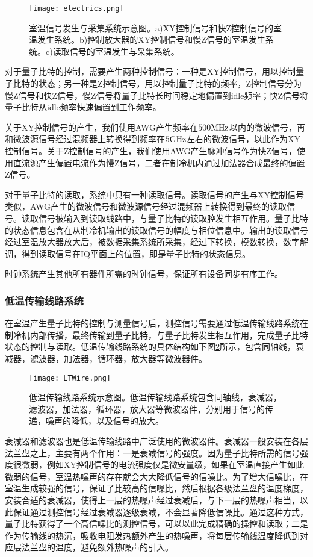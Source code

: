 \begin{figure}[h]
	\centering
	\texttt{[image: electrics.png]}
	\caption{室温信号发生与采集系统示意图。a)XY控制信号和快Z控制信号的室温发生系统。b)控制放大器的XY控制信号和慢Z信号的室温发生系统。c)读取信号的室温发生与采集系统。}
	\label{fig:electrics}
\end{figure}


对于量子比特的控制，需要产生两种控制信号：一种是XY控制信号，用以控制量子比特的状态；另一种是Z控制信号，用以控制量子比特的频率，Z控制信号分为慢Z信号和快Z信号，慢Z信号将量子比特长时间稳定地偏置到idle频率；快Z信号将量子比特从idle频率快速偏置到工作频率。

关于XY控制信号的产生，我们使用AWG产生频率在$\rm 500 MHz$以内的微波信号，再和微波源信号经过混频器上转换得到频率在$\rm 5 GHz$左右的微波信号，以此作为XY控制信号。关于Z控制信号的产生，我们使用AWG产生脉冲信号作为快Z信号，使用直流源产生偏置电流作为慢Z信号，二者在制冷机内通过加法器合成最终的偏置Z信号。

对于量子比特的读取，系统中只有一种读取信号。读取信号的产生与XY控制信号类似，AWG产生的微波信号和微波源信号经过混频器上转换得到最终的读取信号。读取信号被输入到读取线路中，与量子比特的读取腔发生相互作用。量子比特的状态信息包含在从制冷机输出的读取信号的幅度与相位信息中。输出的读取信号经过室温放大器放大后，被数据采集系统所采集，经过下转换，模数转换，数字解调，得到读取信号在IQ平面上的位置，即是量子比特的状态信息。

时钟系统产生其他所有器件所需的时钟信号，保证所有设备同步有序工作。
\subsubsection{低温传输线路系统}
在室温产生量子比特的控制与测量信号后，测控信号需要通过低温传输线路系统在制冷机内部传播，最终传输到量子比特，与量子比特发生相互作用，完成量子比特状态的控制与读取。低温传输线路系统的具体结构如下图\ref{fig:LTWire}所示，包含同轴线，衰减器，滤波器，加法器，循环器，放大器等微波器件。

\begin{figure}[h]
	\centering
	\texttt{[image: LTWire.png]}
	\caption{低温传输线路系统示意图。低温传输线路系统包含同轴线，衰减器，滤波器，加法器，循环器，放大器等微波器件，分别用于信号的传递，噪声的降低，以及信号的放大。}
	\label{fig:LTWire}
\end{figure}

衰减器和滤波器也是低温传输线路中广泛使用的微波器件。衰减器一般安装在各层法兰盘之上，主要有两个作用：一是衰减信号的强度。因为量子比特所需的信号强度很微弱，例如XY控制信号的电流强度仅是微安量级，如果在室温直接产生如此微弱的信号，室温热噪声的存在就会大大降低信号的信噪比。为了增大信噪比，在室温生成较强的信号，保证了比较高的信噪比，然后根据各级法兰盘的温度梯度，安装合适的衰减器，使得上一层的热噪声经过衰减后，与下一层的热噪声相当，以此保证通过测控信号经过衰减器逐级衰减，不会显著降低信噪比\cite{krinner2019engineering}。通过这种方式，量子比特获得了一个高信噪比的测控信号，可以以此完成精确的操控和读取；二是作为传输线的热沉，吸收电阻发热额外产生的热噪声，将每层传输线温度降低到对应层法兰盘的温度，避免额外热噪声的引入。


